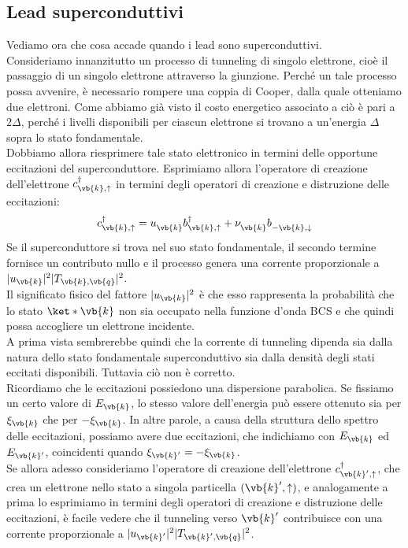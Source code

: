 \subsection{Lead superconduttivi}
Vediamo ora che cosa accade quando i lead sono superconduttivi.\\
Consideriamo innanzitutto un processo di tunneling di singolo elettrone, cioè il passaggio di un singolo elettrone attraverso la giunzione. Perché un tale processo possa avvenire, è necessario rompere una coppia di Cooper, dalla quale otteniamo due elettroni. Come abbiamo già visto il costo energetico associato a ciò è pari a $2\Delta$, perché i livelli disponibili per ciascun elettrone si trovano a un'energia $\Delta$ sopra lo stato fondamentale.\\
Dobbiamo allora riesprimere tale stato elettronico in termini delle opportune eccitazioni del superconduttore. Esprimiamo allora l'operatore di creazione dell'elettrone $c^{\dag}_{\vb{k},\uparrow}$ in termini degli operatori di creazione e distruzione delle eccitazioni:
\begin{equation*}
    c^{\dag}_{\vb{k},\uparrow}
    =
    u^{\vphantom{\dag}}_{\vb{k}} b^{\dag}_{\vb{k},\uparrow}
    +
    \nu^{\vphantom{\dag}}_{\vb{k}} b^{\vphantom{\dag}}_{-\vb{k},\downarrow}
\end{equation*}
Se il superconduttore si trova nel suo stato fondamentale, il secondo termine fornisce un contributo nullo e il processo genera una corrente proporzionale a $|u_{\vb{k}}|^2 |T_{\vb{k},\vb{q}}|^2$.\\
Il significato fisico del fattore $|u_{\vb{k}}|^2$ è che esso rappresenta la probabilità che lo stato $\ket*{\vb{k}}$ non sia occupato nella funzione d'onda BCS e che quindi possa accogliere un elettrone incidente.\\
A prima vista sembrerebbe quindi che la corrente di tunneling dipenda sia dalla natura dello stato fondamentale superconduttivo sia dalla densità degli stati eccitati disponibili. Tuttavia ciò non è corretto.\\
Ricordiamo che le eccitazioni possiedono una dispersione parabolica. Se fissiamo un certo valore di $E_{\vb{k}}$, lo stesso valore dell'energia può essere ottenuto sia per $\xi_{\vb{k}}$ che per $-\xi_{\vb{k}}$. In altre parole, a causa della struttura dello spettro delle eccitazioni, possiamo avere due eccitazioni, che indichiamo con $E_{\vb{k}}$ ed $E_{\vb{k}'}$, coincidenti quando $\xi_{\vb{k}'}=-\xi_{\vb{k}}$.\\
Se allora adesso consideriamo l'operatore di creazione dell'elettrone $c^{\dag}_{\vb{k}',\uparrow}$, che crea un elettrone nello stato a singola particella $(\vb{k}',\uparrow)$, e analogamente a prima lo esprimiamo in termini degli operatori di creazione e distruzione delle eccitazioni, è facile vedere che il tunneling verso $\vb{k}'$ contribuisce con una corrente proporzionale a $|u_{\vb{k}'}|^2 |T_{\vb{k}',\vb{q}}|^2$.\\
